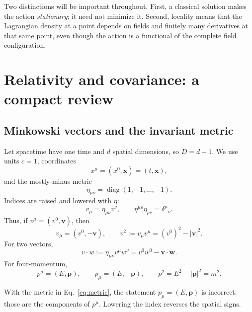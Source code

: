\documentclass[11pt]{article}
\begin{document}
Two distinctions will be important throughout. First, a classical solution
makes the action \emph{stationary}; it need not minimize it. Second, locality
means that the Lagrangian density at a point depends on fields and finitely
many derivatives at that same point, even though the action is a functional
of the complete field configuration.

\section{Relativity and covariance: a compact review}

\subsection{Minkowski vectors and the invariant metric}

Let spacetime have one time and \(d\) spatial dimensions, so \(D=d+1\). We use
units \(c=1\), coordinates
\begin{equation}
  x^\mu=(x^0,\bm{x})=(t,\bm{x}),
\end{equation}
and the mostly-minus metric
\begin{equation}
  \eta_{\mu\nu}=\operatorname{diag}(1,-1,\ldots,-1).
  \label{eq:metric}
\end{equation}
Indices are raised and lowered with \(\eta\):
\begin{equation}
  v_\mu=\eta_{\mu\nu}v^\nu,
  \qquad
  \eta^{\mu\rho}\eta_{\rho\nu}=\delta^\mu{}_\nu.
\end{equation}
Thus, if \(v^\mu=(v^0,\bm v)\), then
\begin{equation}
  v_\mu=(v^0,-\bm v),
  \qquad
  v^2:=v_\mu v^\mu=(v^0)^2-|\bm v|^2.
  \label{eq:MinkowskiNorm}
\end{equation}
For two vectors,
\begin{equation}
  v\cdot w:=\eta_{\mu\nu}v^\mu w^\nu
  =v^0w^0-\bm v\cdot\bm w.
\end{equation}
For four-momentum,
\begin{equation}
  p^\mu=(E,\bm p),
  \qquad
  p_\mu=(E,-\bm p),
  \qquad
  p^2=E^2-|\bm p|^2=m^2.
  \label{eq:massshell}
\end{equation}

\begin{warningbox}
With the metric in Eq.~\eqref{eq:metric}, the statement
\(p_\mu=(E,\bm p)\) is incorrect: those are the components of \(p^\mu\).
Lowering the index reverses the spatial signs.
\end{warningbox}
\end{document}
